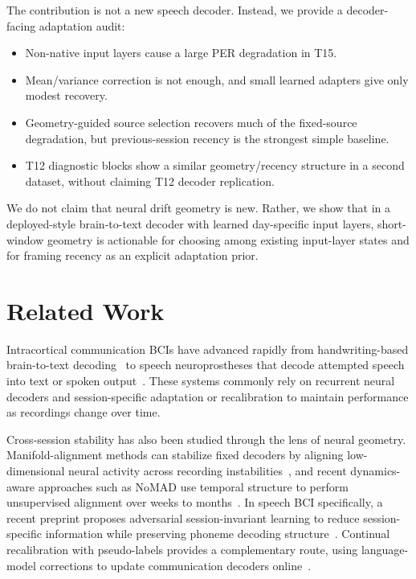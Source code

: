 \documentclass{article}
\begin{document}
The contribution is not a new speech decoder. Instead, we provide a decoder-facing adaptation audit:
\begin{itemize}
    \item Non-native input layers cause a large PER degradation in T15.
    \item Mean/variance correction is not enough, and small learned adapters give only modest recovery.
    \item Geometry-guided source selection recovers much of the fixed-source degradation, but previous-session recency is the strongest simple baseline.
    \item T12 diagnostic blocks show a similar geometry/recency structure in a second dataset, without claiming T12 decoder replication.
\end{itemize}

We do not claim that neural drift geometry is new. Rather, we show that in a deployed-style brain-to-text decoder with learned day-specific input layers, short-window geometry is actionable for choosing among existing input-layer states and for framing recency as an explicit adaptation prior.

\section{Related Work}
Intracortical communication BCIs have advanced rapidly from handwriting-based brain-to-text decoding~\cite{willett2021handwriting,fan2023corp} to speech neuroprostheses that decode attempted speech into text or spoken output~\cite{willett2023speech,card2024accurate}. These systems commonly rely on recurrent neural decoders and session-specific adaptation or recalibration to maintain performance as recordings change over time.

Cross-session stability has also been studied through the lens of neural geometry. Manifold-alignment methods can stabilize fixed decoders by aligning low-dimensional neural activity across recording instabilities~\cite{degenhart2020stabilization}, and recent dynamics-aware approaches such as NoMAD use temporal structure to perform unsupervised alignment over weeks to months~\cite{karpowicz2025nomad}. In speech BCI specifically, a recent preprint proposes adversarial session-invariant learning to reduce session-specific information while preserving phoneme decoding structure~\cite{zhang2026align}. Continual recalibration with pseudo-labels provides a complementary route, using language-model corrections to update communication decoders online~\cite{fan2023corp}.
\end{document}
